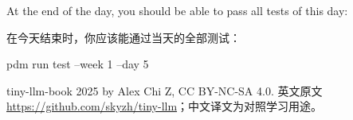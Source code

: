 \documentclass[11pt,a4paper]{article}
\newenvironment{zhpar}{%
  \par\smallskip\begingroup\color{zhcolor}\small\ignorespaces%
}{\endgroup\par\smallskip}
\begin{document}
At the end of the day, you should be able to pass all tests of this day:

\begin{zhpar}
在今天结束时，你应该能通过当天的全部测试：
\end{zhpar}
\begin{codeblock}
pdm run test --week 1 --day 5
\end{codeblock}

\vspace{1em}\begin{center}\small\sffamily tiny-llm-book \textcopyright{} 2025 by Alex Chi Z, CC BY-NC-SA 4.0. 英文原文 \url{https://github.com/skyzh/tiny-llm}；中文译文为对照学习用途。\end{center}
\end{document}
